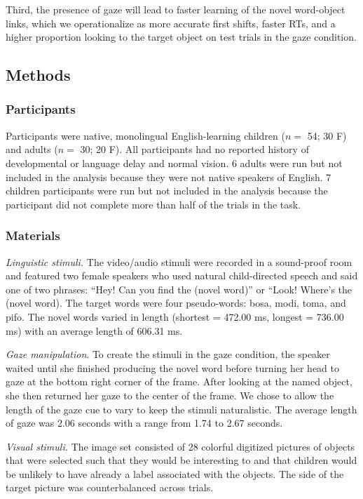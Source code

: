 \documentclass[oneside]{report}
\begin{document}
Third, the presence of gaze will lead to faster learning of the novel
word-object links, which we operationalize as more accurate first
shifts, faster RTs, and a higher proportion looking to the target object
on test trials in the gaze condition.

\subsection{Methods}\label{methods-5}

\subsubsection{Participants}\label{participants-8}

Participants were native, monolingual English-learning children (\(n=\)
54; 30 F) and adults (\(n=\) 30; 20 F). All participants had no reported
history of developmental or language delay and normal vision. 6 adults
were run but not included in the analysis because they were not native
speakers of English. 7 children participants were run but not included
in the analysis because the participant did not complete more than half
of the trials in the task.

\subsubsection{Materials}\label{materials-2}

\emph{Linguistic stimuli.} The video/audio stimuli were recorded in a
sound-proof room and featured two female speakers who used natural
child-directed speech and said one of two phrases: ``Hey! Can you find
the (novel word)'' or ``Look! Where's the (novel word). The target words
were four pseudo-words: bosa, modi, toma, and pifo. The novel words
varied in length (shortest = 472.00 ms, longest = 736.00 ms) with an
average length of 606.31 ms.

\emph{Gaze manipulation}. To create the stimuli in the gaze condition,
the speaker waited until she finished producing the novel word before
turning her head to gaze at the bottom right corner of the frame. After
looking at the named object, she then returned her gaze to the center of
the frame. We chose to allow the length of the gaze cue to vary to keep
the stimuli naturalistic. The average length of gaze was 2.06 seconds
with a range from 1.74 to 2.67 seconds.

\emph{Visual stimuli.} The image set consisted of 28 colorful digitized
pictures of objects that were selected such that they would be
interesting to and that children would be unlikely to have already a
label associated with the objects. The side of the target picture was
counterbalanced across trials.
\end{document}
